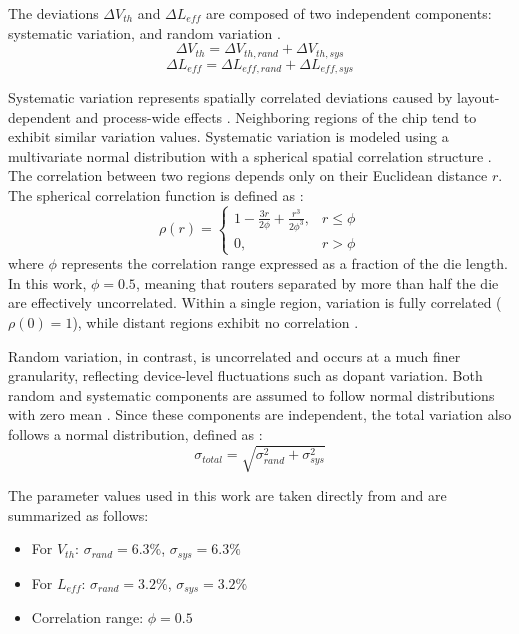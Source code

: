 The deviations $\Delta V_{th}$ and $\Delta L_{eff}$ are composed of two independent components: systematic variation, and random variation \cite{Kuhn2011}.
\begin{equation}
\Delta V_{th} = \Delta V_{th,rand} + \Delta V_{th,sys}
\end{equation}
\begin{equation}
\Delta L_{eff} = \Delta L_{eff,rand} + \Delta L_{eff,sys}
\end{equation}

Systematic variation represents spatially correlated deviations caused by layout-dependent and process-wide effects \cite{Sarangi2008}. Neighboring regions of the chip tend to exhibit similar variation values. Systematic variation is modeled using a multivariate normal distribution with a spherical spatial correlation structure \cite{Sarangi2008}. The correlation between two regions depends only on their Euclidean distance $r$. The spherical correlation function is defined as \cite{Sarangi2008}:
\begin{equation}
\rho(r) =
\begin{cases}
1 - \frac{3r}{2\phi} + \frac{r^3}{2\phi^3}, & r \leq \phi \\
0, & r > \phi
\end{cases}
\end{equation}
where $\phi$ represents the correlation range expressed as a fraction of the die length. In this work, $\phi = 0.5$, meaning that routers separated by more than half the die are effectively uncorrelated. Within a single region, variation is fully correlated ($\rho(0) = 1$), while distant regions exhibit no correlation \cite{Clotho2015}.

Random variation, in contrast, is uncorrelated and occurs at a much finer granularity, reflecting device-level fluctuations such as dopant variation. Both random and systematic components are assumed to follow normal distributions with zero mean \cite{Kuhn2011}. Since these components are independent, the total variation also follows a normal distribution, defined as \cite{Clotho2015}:
\begin{equation}
\sigma_{total} = \sqrt{\sigma_{rand}^2 + \sigma_{sys}^2}
\end{equation}

The parameter values used in this work are taken directly from \cite{Clotho2015} and are summarized as follows:
\begin{itemize}
    \item For $V_{th}$: $\sigma_{rand} = 6.3\%$, $\sigma_{sys} = 6.3\%$
    \item For $L_{eff}$: $\sigma_{rand} = 3.2\%$, $\sigma_{sys} = 3.2\%$
    \item Correlation range: $\phi = 0.5$
\end{itemize}

